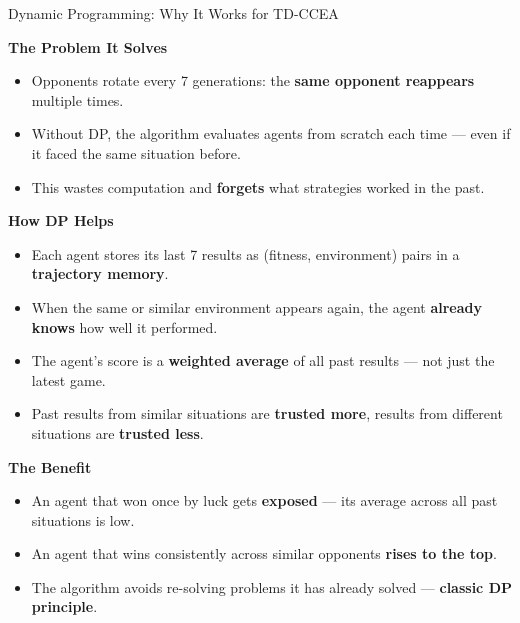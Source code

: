 \documentclass[aspectratio=169, 10pt]{beamer}
\begin{document}
\begin{frame}{Dynamic Programming: Why It Works for TD-CCEA}

\textbf{\textcolor{amritaMaroon}{The Problem It Solves}}
\begin{itemize}
    \item Opponents rotate every 7 generations: the \textbf{same opponent reappears} multiple times.
    \item Without DP, the algorithm evaluates agents from scratch each time --- even if it faced the same situation before.
    \item This wastes computation and \textbf{forgets} what strategies worked in the past.
\end{itemize}

\vspace{0.3cm}
\textbf{\textcolor{amritaMaroon}{How DP Helps}}
\begin{itemize}
    \item Each agent stores its last 7 results as (fitness, environment) pairs in a \textbf{trajectory memory}.
    \item When the same or similar environment appears again, the agent \textbf{already knows} how well it performed.
    \item The agent's score is a \textbf{weighted average} of all past results --- not just the latest game.
    \item Past results from similar situations are \textbf{trusted more}, results from different situations are \textbf{trusted less}.
\end{itemize}

\vspace{0.3cm}
\textbf{\textcolor{amritaMaroon}{The Benefit}}
\begin{itemize}
    \item An agent that won once by luck gets \textbf{exposed} --- its average across all past situations is low.
    \item An agent that wins consistently across similar opponents \textbf{rises to the top}.
    \item The algorithm avoids re-solving problems it has already solved --- \textbf{classic DP principle}.
\end{itemize}

\end{frame}
\end{document}
